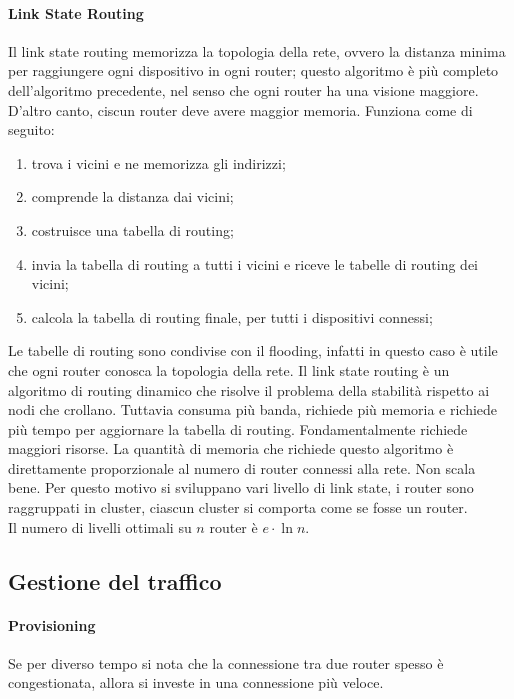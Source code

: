 \documentclass{article}
\begin{document}
\paragraph{Link State Routing}
Il link state routing memorizza la topologia della rete, ovvero la distanza
minima per raggiungere ogni dispositivo in ogni router; questo algoritmo è più
completo dell'algoritmo precedente, nel senso che ogni router ha una visione
maggiore. D'altro canto, ciscun router deve avere maggior memoria.
Funziona come di seguito:
\begin{enumerate}
	\item trova i vicini e ne memorizza gli indirizzi;
	\item comprende la distanza dai vicini;
	\item costruisce una tabella di routing;
	\item invia la tabella di routing a tutti i vicini e riceve le tabelle di
		routing dei vicini;
	\item calcola la tabella di routing finale, per tutti i dispositivi
		connessi;
\end{enumerate}

Le tabelle di routing sono condivise con il flooding, infatti in questo caso è
utile che ogni router conosca la topologia della rete. Il link state routing è
un algoritmo di routing dinamico che risolve il problema della stabilità
rispetto ai nodi che crollano. Tuttavia consuma più banda, richiede più memoria
e richiede più tempo per aggiornare la tabella di routing. Fondamentalmente
richiede maggiori risorse. La quantità di memoria che richiede questo algoritmo
è direttamente proporzionale al numero di router connessi alla rete. Non scala
bene. Per questo motivo si sviluppano vari livello di link state, i router sono
raggruppati in cluster, ciascun cluster si comporta come se fosse un router.\\
Il numero di livelli ottimali su $n$ router è $e \cdot \ln n$.\\

\subsection{Gestione del traffico}
\paragraph{Provisioning}
Se per diverso tempo si nota che la connessione tra due router spesso è
congestionata, allora si investe in una connessione più veloce.\\
\end{document}
